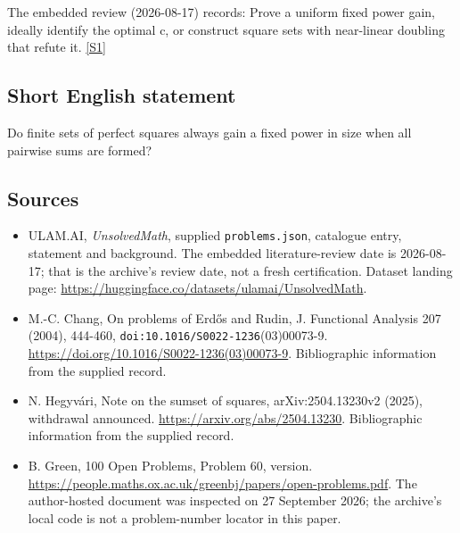 \documentclass[11pt,a4paper]{article}
\newcommand{\sref}[2]{\hyperlink{source:#1:#2}{[S#2]}}
\begin{document}
The embedded review (2026-08-17) records: Prove a uniform fixed power gain, ideally identify the optimal c, or construct square sets with near-linear doubling that refute it. \sref{statement}{1}

\subsection{Short English statement}

Do finite sets of perfect squares always gain a fixed power in size when all pairwise sums are formed?

\subsection{Sources}

{\small

\begin{itemize}

\item[\hypertarget{source:statement:1}{S1}] ULAM.AI, \emph{UnsolvedMath}, supplied \texttt{problems.json}, catalogue entry, statement and background. The embedded literature-review date is 2026-08-17; that is the archive’s review date, not a fresh certification. Dataset landing page: \url{https://huggingface.co/datasets/ulamai/UnsolvedMath}.

\item[\hypertarget{source:statement:2}{S2}] M.-C. Chang, On problems of Erdős and Rudin, J. Functional Analysis 207 (2004), 444-460, \nolinkurl{doi:10.1016/S0022-1236}(03)00073-9. \url{https://doi.org/10.1016/S0022-1236(03)00073-9}. Bibliographic information from the supplied record.

\item[\hypertarget{source:statement:3}{S3}] N. Hegyvári, Note on the sumset of squares, arXiv:2504.13230v2 (2025), withdrawal announced. \url{https://arxiv.org/abs/2504.13230}. Bibliographic information from the supplied record.

\item[\hypertarget{source:statement:4}{S4}] B. Green, 100 Open Problems, Problem 60, version. \url{https://people.maths.ox.ac.uk/greenbj/papers/open-problems.pdf}. The author-hosted document was inspected on 27 September 2026; the archive’s local code is not a problem-number locator in this paper.

\end{itemize}

}

\label{end:statement}
\end{document}

